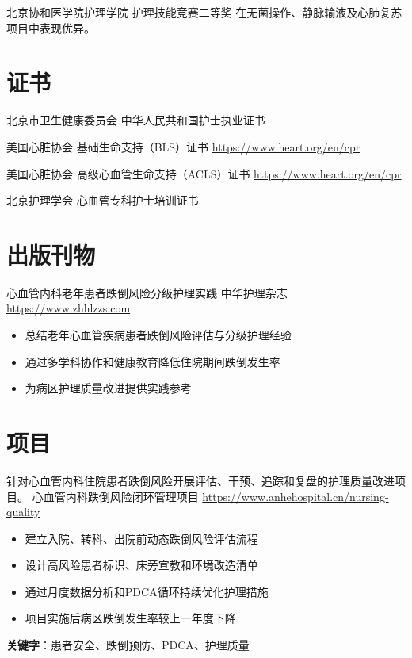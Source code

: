 \documentclass[a4paper, serif, 10pt]{moderncv}
\begin{document}
        {北京协和医学院护理学院}
        {护理技能竞赛二等奖}
        {}
        {}
        {在无菌操作、静脉输液及心肺复苏项目中表现优异。}
\section{证书}

        {北京市卫生健康委员会}
        {中华人民共和国护士执业证书}
        {}
        {}
        {}

        {美国心脏协会}
        {基础生命支持（BLS）证书}
        {\url{https://www.heart.org/en/cpr}}
        {}
        {}

        {美国心脏协会}
        {高级心血管生命支持（ACLS）证书}
        {\url{https://www.heart.org/en/cpr}}
        {}
        {}

        {北京护理学会}
        {心血管专科护士培训证书}
        {}
        {}
        {}
\section{出版刊物}

        {心血管内科老年患者跌倒风险分级护理实践}
        {中华护理杂志}
        {\url{https://www.zhhlzzs.com}}
        {}
        {\begin{itemize}
\item 总结老年心血管疾病患者跌倒风险评估与分级护理经验
\item 通过多学科协作和健康教育降低住院期间跌倒发生率
\item 为病区护理质量改进提供实践参考
\end{itemize}}
\section{项目}

        {针对心血管内科住院患者跌倒风险开展评估、干预、追踪和复盘的护理质量改进项目。}
        {心血管内科跌倒风险闭环管理项目}
        {\url{https://www.anhehospital.cn/nursing-quality}}
        {}
        {\begin{itemize}
\item 建立入院、转科、出院前动态跌倒风险评估流程
\item 设计高风险患者标识、床旁宣教和环境改造清单
\item 通过月度数据分析和PDCA循环持续优化护理措施
\item 项目实施后病区跌倒发生率较上一年度下降
\end{itemize}
\textbf{关键字}：患者安全、跌倒预防、PDCA、护理质量}
\end{document}
